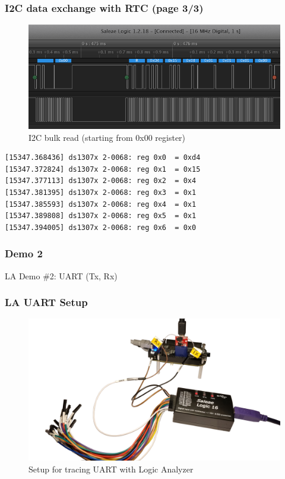 \begin{frame}[containsverbatim]
  \frametitle{I2C data exchange with RTC (page 3/3)}
  \vspace*{-1mm}
  \begin{figure}
    \centering
    \includegraphics[scale=0.5]{images/la-i2c-read-bulk.png}
    \caption{I2C bulk read (starting from 0x00 register)}
  \end{figure}
  \begin{lstlisting}[numbers=none]
[15347.368436] ds1307x 2-0068: reg 0x0  = 0xd4
[15347.372824] ds1307x 2-0068: reg 0x1  = 0x15
[15347.377113] ds1307x 2-0068: reg 0x2  = 0x4
[15347.381395] ds1307x 2-0068: reg 0x3  = 0x1
[15347.385593] ds1307x 2-0068: reg 0x4  = 0x1
[15347.389808] ds1307x 2-0068: reg 0x5  = 0x1
[15347.394005] ds1307x 2-0068: reg 0x6  = 0x0
  \end{lstlisting}
  \vspace*{-7mm}
\end{frame}

\begin{frame}[standout]
  \frametitle{Demo 2}
  LA Demo \#2: UART (Tx, Rx)
\end{frame}

\begin{frame}
  \frametitle{LA UART Setup}
  \begin{figure}
    \centering
    \includegraphics[scale=0.087]{images/la-uart-setup.png}
    \vspace*{-1mm}
    \caption{Setup for tracing UART with Logic Analyzer}
  \end{figure}
  \vspace*{-7mm}
\end{frame}

